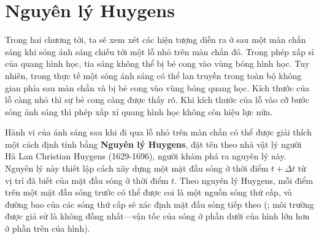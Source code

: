 \section{Nguyên lý Huygens}\label{sec:16_9}

Trong hai chương tới, ta sẽ xem xét các hiện tượng diễn ra ở sau một màn chắn sáng khi sóng ánh sáng chiếu tới một lỗ nhỏ trên màn chắn đó.
Trong phép xấp sỉ của quang hình học, tia sáng không thể bị bẻ cong vào vùng bóng hình học.
Tuy nhiên, trong thực tế một sóng ánh sáng có thể lan truyền trong toàn bộ không gian phía sau màn chắn và bị bẻ cong vào vùng bóng quang học. Kích thước của lỗ càng nhỏ thì sự bẻ cong càng được thấy rõ.
Khi kích thước của lỗ vào cỡ bước sóng ánh sáng thì phép xấp xỉ quang hình học không còn hiệu lực nữa.

Hành vi của ánh sáng sau khi đi qua lỗ nhỏ trên màn chắn có thể được giải thích một cách định tính bằng \textbf{Nguyên lý Huygens}, đặt tên theo nhà vật lý người Hà Lan Christian Huygens (1629-1696), người khám phá ra nguyên lý này.
Nguyên lý này thiết lập cách xây dựng một mặt đầu sóng ở thời điểm $t+\Delta{t}$ từ vị trí đã biết của mặt đầu sóng ở thời điểm $t$.
Theo nguyên lý Huygens, mỗi điểm trên một mặt đầu sóng trước có thể được coi là một nguồn sóng thứ cấp, và đường bao của các sóng thứ cấp sẽ xác định mặt đầu sóng tiếp theo (; môi trường được giả sử là không đồng nhất---vận tốc của sóng ở phần dưới của hình lớn hơn ở phần trên của hình).

